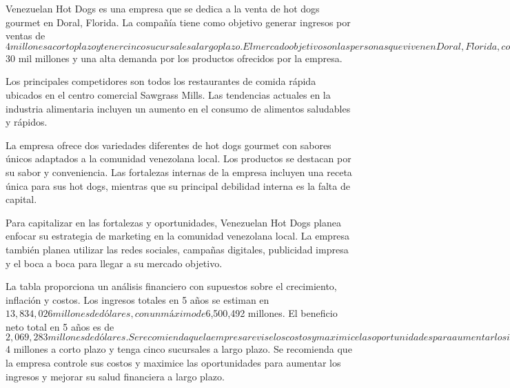 Venezuelan Hot Dogs es una empresa que se dedica a la venta de hot dogs gourmet en Doral, Florida. La compañía tiene como objetivo generar ingresos por ventas de $4 millones a corto plazo y tener cinco sucursales a largo plazo. El mercado objetivo son las personas que viven en Doral, Florida, con un tamaño estimado del mercado de $30 mil millones y una alta demanda por los productos ofrecidos por la empresa.

Los principales competidores son todos los restaurantes de comida rápida ubicados en el centro comercial Sawgrass Mills. Las tendencias actuales en la industria alimentaria incluyen un aumento en el consumo de alimentos saludables y rápidos.

La empresa ofrece dos variedades diferentes de hot dogs gourmet con sabores únicos adaptados a la comunidad venezolana local. Los productos se destacan por su sabor y conveniencia. Las fortalezas internas de la empresa incluyen una receta única para sus hot dogs, mientras que su principal debilidad interna es la falta de capital.

Para capitalizar en las fortalezas y oportunidades, Venezuelan Hot Dogs planea enfocar su estrategia de marketing en la comunidad venezolana local. La empresa también planea utilizar las redes sociales, campañas digitales, publicidad impresa y el boca a boca para llegar a su mercado objetivo.

La tabla proporciona un análisis financiero con supuestos sobre el crecimiento, inflación y costos. Los ingresos totales en 5 años se estiman en $13,834,026 millones de dólares, con un máximo de $6,500,492 millones. El beneficio neto total en 5 años es de $2,069,283 millones de dólares. Se recomienda que la empresa revise los costos y maximice las oportunidades para aumentar los ingresos para mejorar su salud financiera.

En cuanto a operaciones, Venezuelan Hot Dogs tiene dos locaciones: una pequeña cocina donde se preparan los alimentos en Doral y otra tienda pequeña dentro del centro comercial Sawgrass Mills. La empresa trabaja con tres proveedores diferentes para las salchichas utilizadas en sus hot dogs y solo uno para el pan utilizado. Las compras se realizan semanalmente analizando las ventas semanales previas.

En resumen, Venezuelan Hot Dogs es una empresa de responsabilidad limitada que se dedica a la venta de hot dogs gourmet en Doral, Florida. La empresa tiene planes para expandirse y capitalizar en el mercado venezolano local mediante estrategias de marketing enfocadas en la comunidad venezolana. Se espera que la empresa genere ingresos por ventas de $4 millones a corto plazo y tenga cinco sucursales a largo plazo. Se recomienda que la empresa controle sus costos y maximice las oportunidades para aumentar los ingresos y mejorar su salud financiera a largo plazo.